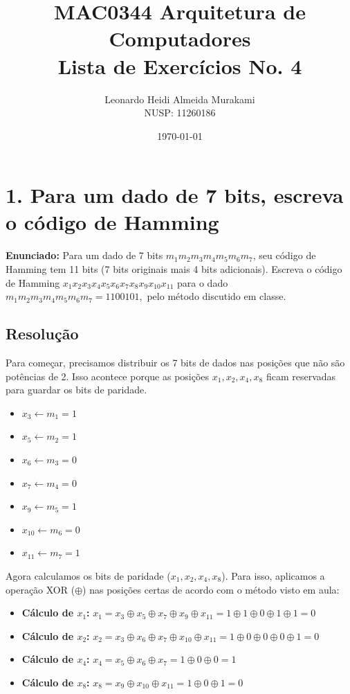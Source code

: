 \documentclass{article}
\title{MAC0344 Arquitetura de Computadores \\ Lista de Exercícios No. 4}
\author{Leonardo Heidi Almeida Murakami \\ NUSP: 11260186}
\date{\today}
\begin{document}
\maketitle

\section*{1. Para um dado de 7 bits, escreva o código de Hamming}

\textbf{Enunciado:} Para um dado de 7 bits $m_{1}m_{2}m_{3}m_{4}m_{5}m_{6}m_{7}$, seu código de Hamming tem 11 bits (7 bits originais mais 4 bits adicionais). Escreva o código de Hamming $x_{1}x_{2}x_{3}x_{4}x_{5}x_{6}x_{7}x_{8}x_{9}x_{10}x_{11}$ para o dado $m_{1}m_{2}m_{3}m_{4}m_{5}m_{6}m_{7}=1100101,$ pelo método discutido em classe.

\subsection*{Resolução}

Para começar, precisamos distribuir os 7 bits de dados nas posições que não são potências de 2. Isso acontece porque as posições $x_1, x_2, x_4, x_8$ ficam reservadas para guardar os bits de paridade.

\begin{itemize}
    \item $x_3 \leftarrow m_1 = 1$
    \item $x_5 \leftarrow m_2 = 1$
    \item $x_6 \leftarrow m_3 = 0$
    \item $x_7 \leftarrow m_4 = 0$
    \item $x_9 \leftarrow m_5 = 1$
    \item $x_{10} \leftarrow m_6 = 0$
    \item $x_{11} \leftarrow m_7 = 1$
\end{itemize}

Agora calculamos os bits de paridade ($x_1, x_2, x_4, x_8$). Para isso, aplicamos a operação XOR ($\oplus$) nas posições certas de acordo com o método visto em aula:

\begin{itemize}
    \item \textbf{Cálculo de $x_1$:}
    $x_1 = x_3 \oplus x_5 \oplus x_7 \oplus x_9 \oplus x_{11} = 1 \oplus 1 \oplus 0 \oplus 1 \oplus 1 = 0$
    
    \bigskip
    \item \textbf{Cálculo de $x_2$:}
    $x_2 = x_3 \oplus x_6 \oplus x_7 \oplus x_{10} \oplus x_{11} = 1 \oplus 0 \oplus 0 \oplus 0 \oplus 1 = 0$
    
    \bigskip
    \item \textbf{Cálculo de $x_4$:}
    $x_4 = x_5 \oplus x_6 \oplus x_7 = 1 \oplus 0 \oplus 0 = 1$
    
    \bigskip
    \item \textbf{Cálculo de $x_8$:}
    $x_8 = x_9 \oplus x_{10} \oplus x_{11} = 1 \oplus 0 \oplus 1 = 0$
\end{itemize}
\end{document}
